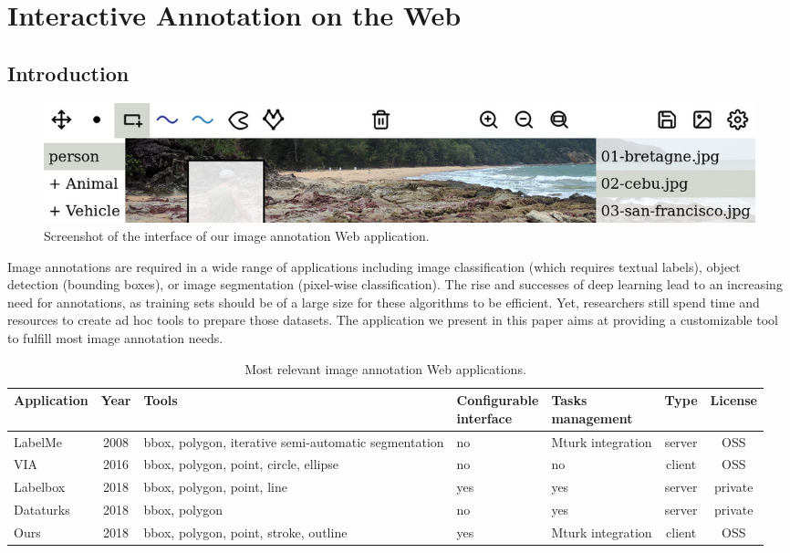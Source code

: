 \chapter{Interactive Annotation on the Web}%
\label{cha:interactive_annotation_on_the_web}

\section{Introduction}

\begin{figure}[ht]
  \includegraphics[width=\textwidth]{assets/img/annotation-app-thin.jpg}
  \caption{Screenshot of the interface of our image annotation Web application.}%
  \label{fig:teaser}
\end{figure}

Image annotations are required in a wide range of applications
including image classification (which requires textual labels),
object detection (bounding boxes), or image segmentation (pixel-wise classification).
The rise and successes of deep learning lead to an increasing need for annotations,
as training sets should be of a large size for these algorithms to be efficient.
Yet, researchers still spend time and resources
to create ad hoc tools to prepare those datasets.
The application we present in this paper aims at providing a customizable tool
to fulfill most image annotation needs.

\begin{table}[ht]

\begin{tabular}{lclllcc}
Application
	& Year
    & Tools
    & \makecell[l]{Configurable\\interface}
    & \makecell[l]{Tasks\\management}
    & Type
    & License \\
    \midrule
LabelMe
	& 2008
    & bbox, polygon, iterative semi-automatic segmentation
    & no
    & Mturk integration
    & server
    & OSS \\
VIA
	& 2016
    & bbox, polygon, point, circle, ellipse
    & no
    & no
    & client
    & OSS \\
Labelbox
	& 2018
    & bbox, polygon, point, line
    & yes
    & yes
    & server
    & private \\
Dataturks
	& 2018
    & bbox, polygon
    & no
    & yes
    & server
    & private \\
Ours
	& 2018
    & bbox, polygon, point, stroke, outline
    & yes
    & Mturk integration
    & client
    & OSS \\
\end{tabular}

\caption{Most relevant image annotation Web applications.}%
\label{tab:web-apps}
\end{table}

